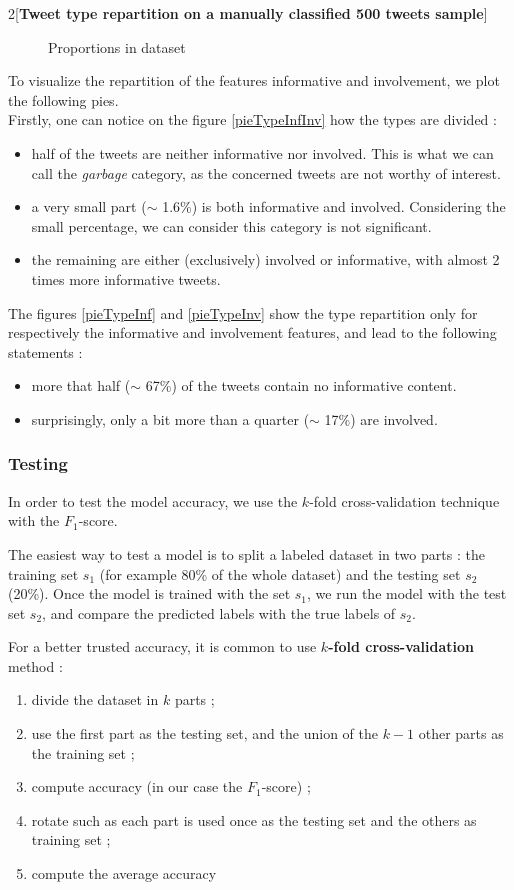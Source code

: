 \documentclass[a4paper,twoside,12pt,openright]{report}
\begin{document}
\begin{multicols}{2}[\textbf{Tweet type repartition on a manually classified 500 tweets sample}]
\begin{figure}[H]
\caption{Proportions in dataset}
\end{figure}

To visualize the repartition of the features informative and involvement, we plot the following pies.\\
Firstly, one can notice on the figure \ref{pieTypeInfInv} how the types are divided : 
\begin{itemize}
\item half of the tweets are neither informative nor involved. This is what we can call the \emph{garbage} category, as the concerned tweets are not worthy of interest.
\item a very small part ($\sim$ 1.6\%) is both informative and involved. Considering the small percentage, we can consider this category is not significant.
\item the remaining are either (exclusively) involved or informative, with almost 2 times more informative tweets.
\end{itemize}

The figures \ref{pieTypeInf} and \ref{pieTypeInv} show the type repartition only for respectively the informative and involvement features, and lead to the following statements :
\begin{itemize}
\item more that half ($\sim$ 67\%) of the tweets contain no informative content.
\item surprisingly, only a bit more than a quarter ($\sim$ 17\%) are involved.
\end{itemize}


\end{multicols}

\subsubsection{Testing}
In order to test the model accuracy, we use the $k$-fold cross-validation technique with the $F_1$-score.

The easiest way to test a model is to split a labeled dataset in two parts : the training set $s_1$ (for example 80\% of the whole dataset) and the testing set $s_2$ (20\%). Once the model is trained with the set $s_1$, we run the model with the test set $s_2$, and compare the predicted labels with the true labels of $s_2$.

For a better trusted accuracy, it is common to use \textbf{$k$-fold cross-validation} method :
\begin{enumerate}
\item divide the dataset in $k$ parts ;
\item use the first part as the testing set, and the union of the $k-1$ other parts as the training set ;
\item compute accuracy (in our case the $F_1$-score) ;
\item rotate such as each part is used once as the testing set and the others as training set ;
\item compute the average accuracy
\end{enumerate}
\end{document}
